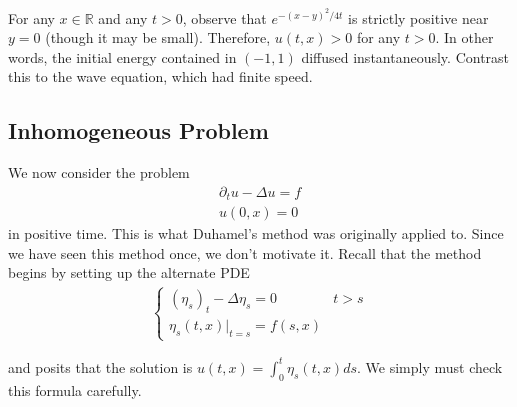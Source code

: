 \documentclass{article}
\newcommand{\R}{{\mathbb{R}}}
\newcommand{\pd}{\partial}
\begin{document}
	For any $x \in \R$ and any $t > 0$, observe that $e^{-(x-y)^{2}/4t}$ is strictly positive near $y=0$ (though it may be small). Therefore, $u(t,x) > 0$ for any $t>0$. In other words, the initial energy contained in $(-1,1)$ diffused instantaneously. Contrast this to the wave equation, which had finite speed. 
	
	\subsection{Inhomogeneous Problem}
	
	We now consider the problem 
	\begin{align*}
		\pd_{t} u - \Delta u = f \\
		u(0,x) = 0
	\end{align*}
	in positive time. This is what Duhamel's method was originally applied to. Since we have seen this method once, we don't motivate it. Recall that the method begins by setting up the alternate PDE
	\begin{align*}
		\begin{cases}
			(\eta_{s})_{t} - \Delta \eta_{s} = 0 & t > s \\
			\eta_{s}(t,x)|_{t=s} = f(s,x) &
		\end{cases}
	\end{align*}
	
	and posits that the solution is $u(t,x) = \int_{0}^{t} \eta_{s}(t,x) ds$. We simply must check this formula carefully. 
\end{document}
